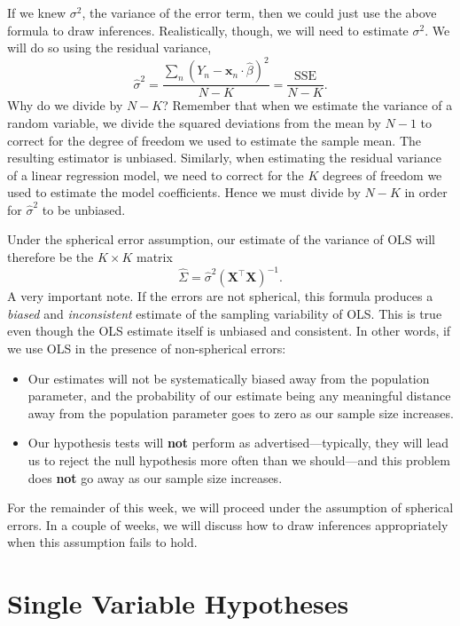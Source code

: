 \documentclass[
  12pt,
  oneside,openany]{book}
\begin{document}
If we knew \(\sigma^2\), the variance of the error term, then we could just use the above formula to draw inferences. Realistically, though, we will need to estimate \(\sigma^2\). We will do so using the residual variance,
\[
\hat{\sigma}^2
= \frac{\sum_n (Y_n - \mathbf{x}_n \cdot \hat{\beta})^2}{N - K}
= \frac{\text{SSE}}{N - K}.
\]
Why do we divide by \(N - K\)? Remember that when we estimate the variance of a random variable, we divide the squared deviations from the mean by \(N - 1\) to correct for the degree of freedom we used to estimate the sample mean. The resulting estimator is unbiased. Similarly, when estimating the residual variance of a linear regression model, we need to correct for the \(K\) degrees of freedom we used to estimate the model coefficients. Hence we must divide by \(N - K\) in order for \(\hat{\sigma}^2\) to be unbiased.

Under the spherical error assumption, our estimate of the variance of OLS will therefore be the \(K \times K\) matrix
\[
\hat{\Sigma} = \hat{\sigma}^2 (\mathbf{X}^\top \mathbf{X})^{-1}.
\]
A very important note. If the errors are not spherical, this formula produces a \emph{biased} and \emph{inconsistent} estimate of the sampling variability of OLS. This is true even though the OLS estimate itself is unbiased and consistent. In other words, if we use OLS in the presence of non-spherical errors:

\begin{itemize}
\item
  Our estimates will not be systematically biased away from the population parameter, and the probability of our estimate being any meaningful distance away from the population parameter goes to zero as our sample size increases.
\item
  Our hypothesis tests will \textbf{not} perform as advertised---typically, they will lead us to reject the null hypothesis more often than we should---and this problem does \textbf{not} go away as our sample size increases.
\end{itemize}

For the remainder of this week, we will proceed under the assumption of spherical errors. In a couple of weeks, we will discuss how to draw inferences appropriately when this assumption fails to hold.

\hypertarget{single-variable-hypotheses}{%
\section{Single Variable Hypotheses}\label{single-variable-hypotheses}}
\end{document}
